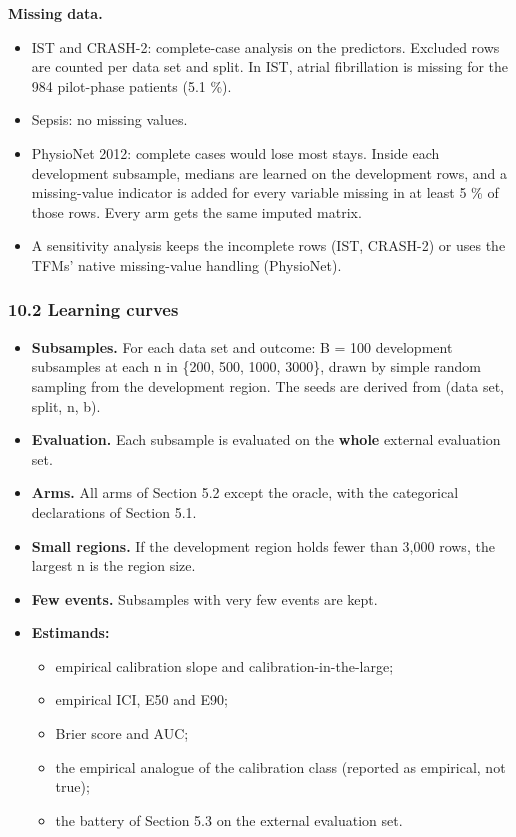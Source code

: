 \documentclass[
  10pt,
]{article}
\providecommand{\tightlist}{%
  \setlength{\itemsep}{0pt}\setlength{\parskip}{0pt}}
\begin{document}
\textbf{Missing data.}

\begin{itemize}
\tightlist
\item
  IST and CRASH-2: complete-case analysis on the predictors.
  Excluded rows are counted per data set and split. In IST,
  atrial fibrillation is missing for the 984 pilot-phase
  patients (5.1 \%).
\item
  Sepsis: no missing values.
\item
  PhysioNet 2012: complete cases would lose most stays.
  Inside each development subsample, medians are learned on
  the development rows, and a missing-value indicator is
  added for every variable missing in at least 5 \% of those
  rows. Every arm gets the same imputed matrix.
\item
  A sensitivity analysis keeps the incomplete rows (IST,
  CRASH-2) or uses the TFMs' native missing-value handling
  (PhysioNet).
\end{itemize}

\subsubsection{10.2 Learning curves}\label{learning-curves}

\begin{itemize}
\tightlist
\item
  \textbf{Subsamples.} For each data set and outcome: B =
  100 development subsamples at each n in \{200, 500, 1000,
  3000\}, drawn by simple random sampling from the
  development region. The seeds are derived from (data set,
  split, n, b).
\item
  \textbf{Evaluation.} Each subsample is evaluated on the
  \textbf{whole} external evaluation set.
\item
  \textbf{Arms.} All arms of Section 5.2 except the oracle,
  with the categorical declarations of Section 5.1.
\item
  \textbf{Small regions.} If the development region holds
  fewer than 3,000 rows, the largest n is the region size.
\item
  \textbf{Few events.} Subsamples with very few events are
  kept.
\item
  \textbf{Estimands:}

  \begin{itemize}
  \tightlist
  \item
    empirical calibration slope and
    calibration-in-the-large;
  \item
    empirical ICI, E50 and E90;
  \item
    Brier score and AUC;
  \item
    the empirical analogue of the calibration class
    (reported as empirical, not true);
  \item
    the battery of Section 5.3 on the external evaluation
    set.
  \end{itemize}
\end{itemize}
\end{document}
